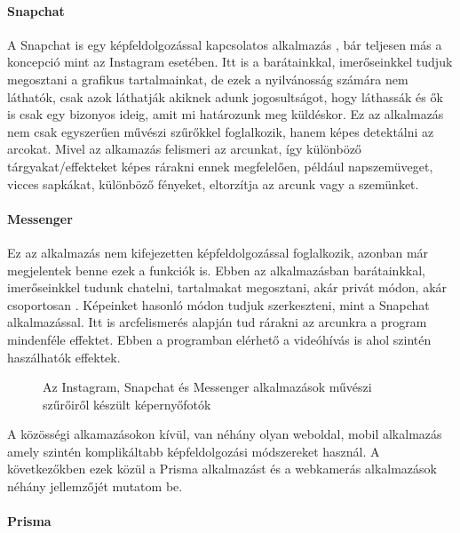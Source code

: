 \paragraph{Snapchat} 

A Snapchat is egy képfeldolgozással kapcsolatos alkalmazás \cite{snapchat}, bár teljesen más a koncepció mint az Instagram esetében. Itt is a barátainkkal, imerőseinkkel tudjuk megosztani a grafikus tartalmainkat, de ezek a nyilvánosság számára nem láthatók, csak azok láthatják akiknek adunk jogosultságot, hogy láthassák és ők is csak egy bizonyos ideig, amit mi határozunk meg küldéskor. Ez az alkalmazás nem csak egyszerűen művészi szűrőkkel foglalkozik, hanem képes detektálni az arcokat. Mivel az alkamazás felismeri az arcunkat, így különböző tárgyakat/effekteket képes rárakni ennek megfelelően, például napszemüveget, vicces sapkákat,  különböző fényeket, eltorzítja az arcunk vagy a szemünket.

\paragraph{Messenger} 

Ez az alkalmazás nem kifejezetten képfeldolgozással foglalkozik, azonban már megjelentek benne ezek a funkciók is. Ebben az alkalmazásban barátainkkal, imerőseinkkel tudunk chatelni, tartalmakat megosztani, akár privát módon, akár csoportosan \cite{messenger}. Képeinket hasonló módon tudjuk szerkeszteni, mint a Snapchat alkalmazással. Itt is arcfelismerés alapján tud rárakni az arcunkra a program mindenféle effektet. Ebben a programban elérhető a videóhívás is ahol szintén haszálhatók effektek.

\begin{figure}[ht]
\centering
{}
\caption{Az Instagram, Snapchat és Messenger alkalmazások művészi szűrőiről készült képernyőfotók} 
\label{fig:social_media}
\end{figure}


A közösségi alkamazásokon kívül, van néhány olyan weboldal, mobil alkalmazás amely szintén komplikáltabb képfeldolgozási módszereket használ. A következőkben ezek közül a Prisma alkalmazást és a webkamerás alkalmazások néhány jellemzőjét mutatom be.

\paragraph{Prisma}


